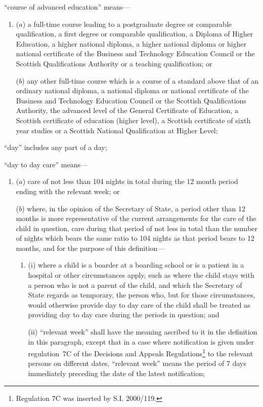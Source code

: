 \documentclass[12pt,a4paper]{article}
\begin{document}
\begin{enumerate}
“course of advanced education” means—
\begin{enumerate}\item[]
($a$) 
a full-time course leading to a postgraduate degree or comparable qualification, a first degree or comparable qualification, a Diploma of Higher Education, a higher national diploma, a higher national diploma or higher national certificate of the Business and Technology Education Council or the Scottish Qualifications Authority or a teaching qualification; or

($b$) 
any other full-time course which is a course of a standard above that of an ordinary national diploma, a national diploma or national certificate of the Business and Technology Education Council or the Scottish Qualifications Authority, the advanced level of the General Certificate of Education, a Scottish certificate of education (higher level), a Scottish certificate of sixth year studies or a Scottish National Qualification at Higher Level;
\end{enumerate}

“day” includes any part of a day;

“day to day care” means—
\begin{enumerate}\item[]
($a$) 
care of not less than 104 nights in total during the 12 month period ending with the relevant week; or

($b$) 
where, in the opinion of the Secretary of State, a period other than 12 months is more representative of the current arrangements for the care of the child in question, care during that period of not less in total than the number of nights which bears the same ratio to 104 nights as that period bears to 12 months, and for the purpose of this definition—
\begin{enumerate}\item[]
(i)
where a child is a boarder at a boarding school or is a patient in a hospital or other circumstances apply, such as where the child stays with a person who is not a parent of the child, and which the Secretary of State regards as temporary, the person who, but for those circumstances, would otherwise provide day to day care of the child shall be treated as providing day to day care during the periods in question; and

(ii)
“relevant week” shall have the meaning ascribed to it in the definition in this paragraph, except that in a case where notification is given under regulation~7C of the Decisions and Appeals Regulations\footnote{\frenchspacing Regulation 7C was inserted by S.I. 2000/119.} to the relevant persons on different dates, “relevant week” means the period of 7 days immediately preceding the date of the latest notification;
\end{enumerate}
\end{enumerate}


\end{enumerate}
\end{document}
